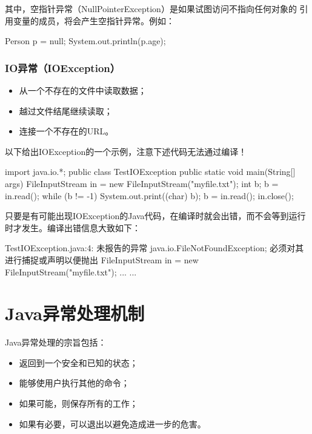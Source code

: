 其中，空指针异常（NullPointerException）是如果试图访问不指向任何对象的
引用变量的成员，将会产生空指针异常。例如：

\begin{javaCode}
Person p = null;
System.out.println(p.age);  
\end{javaCode}

\subsubsection{IO异常（IOException）}

\begin{itemize}
\item 从一个不存在的文件中读取数据；
\item 越过文件结尾继续读取；
\item 连接一个不存在的URL。
\end{itemize}

以下给出IOException的一个示例，注意下述代码无法通过编译！


\begin{javaCode}
import java.io.*;
public class TestIOException {
  public static void main(String[] args) {
    FileInputStream in = new FileInputStream("myfile.txt");
    int b;
    b = in.read();
    while (b != -1) {
      System.out.print((char) b);
      b = in.read();
    }
    in.close();
  }
}  
\end{javaCode}


只要是有可能出现IOException的Java代码，在编译时就会出错，而不会等到运行
时才发生。编译出错信息大致如下：

\begin{stdoutCode}
TestIOException.java:4: 未报告的异常 java.io.FileNotFoundException; 
必须对其进行捕捉或声明以便抛出
    FileInputStream in = new FileInputStream("myfile.txt");
... ...
\end{stdoutCode}

\section{Java异常处理机制}

Java异常处理的宗旨包括：

\begin{itemize}
\item 返回到一个安全和已知的状态；
\item 能够使用户执行其他的命令；
\item 如果可能，则保存所有的工作；
\item 如果有必要，可以退出以避免造成进一步的危害。
\end{itemize}

